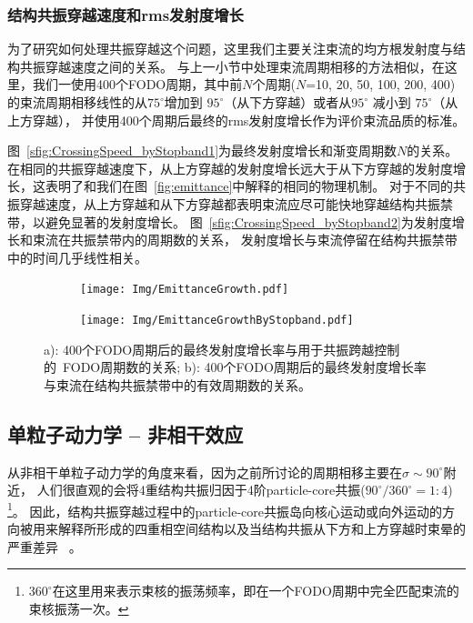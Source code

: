 \subsubsection{结构共振穿越速度和rms发射度增长}
为了研究如何处理共振穿越这个问题，这里我们主要关注束流的均方根发射度与结构共振穿越速度之间的关系。
与上一小节中处理束流周期相移的方法相似，在这里，我们一使用400个FODO周期，其中前$N$个周期($N$=10, 20, 50, 100, 200, 400)的束流周期相移线性的从$75^\circ$增加到  $95^\circ$（从下方穿越）或者从$95^\circ$ 减小到 $75^\circ$（从上方穿越），
并使用400个周期后最终的rms发射度增长作为评价束流品质的标准。

图~\eqref{sfig:CrossingSpeed_byStopband1}为最终发射度增长和渐变周期数$N$的关系。在相同的共振穿越速度下，从上方穿越的发射度增长远大于从下方穿越的发射度增长，这表明了和我们在图~\eqref{fig:emittance}中解释的相同的物理机制。
对于不同的共振穿越速度，从上方穿越和从下方穿越都表明束流应尽可能快地穿越结构共振禁带，以避免显著的发射度增长。
图~\eqref{sfig:CrossingSpeed_byStopband2}为发射度增长和束流在共振禁带内的周期数的关系，
发射度增长与束流停留在结构共振禁带中的时间几乎线性相关。

\begin{figure}[thbp]
    \centering
    \begin{subfigure}[b]{0.48\textwidth}
        \texttt{[image: Img/EmittanceGrowth.pdf]}
        \caption{}
        \label{sfig:CrossingSpeed_byStopband1}
    \end{subfigure}
    \begin{subfigure}[b]{0.48\textwidth}
        \texttt{[image: Img/EmittanceGrowthByStopband.pdf]}
        \caption{}
        \label{sfig:CrossingSpeed_byStopband2}
    \end{subfigure}
    \caption{
    a): 400个FODO周期后的最终发射度增长率与用于共振跨越控制的~FODO周期数的关系;
    b): 400个FODO周期后的最终发射度增长率与束流在结构共振禁带中的有效周期数的关系。}
    \label{fig:CrossingSpeed}
\end{figure}

\subsection{单粒子动力学 -- 非相干效应}
\label{section:Crossing_Incoherent}
从非相干单粒子动力学的角度来看，因为之前所讨论的周期相移主要在$\sigma\sim90^\circ$附近，
人们很直观的会将4重结构共振归因于4阶particle-core共振($90^\circ/360^\circ=1:4$)
\footnote{$360^\circ$在这里用来表示束核的振荡频率，即在一个FODO周期中完全匹配束流的束核振荡一次。}。
因此，结构共振穿越过程中的particle-core共振岛向核心运动或向外运动的方向被用来解释所形成的四重相空间结构以及当结构共振从下方和上方穿越时束晕的严重差异~\cite{25} 。

